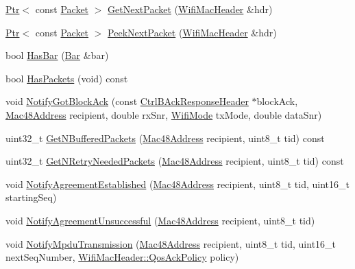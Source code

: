 \begin{DoxyCompactItemize}
\item 
\hyperlink{classns3_1_1Ptr}{Ptr}$<$ const \hyperlink{classns3_1_1Packet}{Packet} $>$ \hyperlink{classns3_1_1BlockAckManager_a11266152bf97c5ed1a06410d6fda4cc9}{Get\+Next\+Packet} (\hyperlink{classns3_1_1WifiMacHeader}{Wifi\+Mac\+Header} \&hdr)
\item 
\hyperlink{classns3_1_1Ptr}{Ptr}$<$ const \hyperlink{classns3_1_1Packet}{Packet} $>$ \hyperlink{classns3_1_1BlockAckManager_a27160e30a1652c3a2cf4c0fca44f4166}{Peek\+Next\+Packet} (\hyperlink{classns3_1_1WifiMacHeader}{Wifi\+Mac\+Header} \&hdr)
\item 
bool \hyperlink{classns3_1_1BlockAckManager_a361d518c0824a4b353336475cda25978}{Has\+Bar} (\hyperlink{structns3_1_1Bar}{Bar} \&bar)
\item 
bool \hyperlink{classns3_1_1BlockAckManager_aa4d33e4f453efea9967dc2ebb7142210}{Has\+Packets} (void) const 
\item 
void \hyperlink{classns3_1_1BlockAckManager_a9b24f21a11eb094fa683943b7fc3c747}{Notify\+Got\+Block\+Ack} (const \hyperlink{classns3_1_1CtrlBAckResponseHeader}{Ctrl\+B\+Ack\+Response\+Header} $\ast$block\+Ack, \hyperlink{classns3_1_1Mac48Address}{Mac48\+Address} recipient, double rx\+Snr, \hyperlink{classns3_1_1WifiMode}{Wifi\+Mode} tx\+Mode, double data\+Snr)
\item 
uint32\+\_\+t \hyperlink{classns3_1_1BlockAckManager_af1da67d0de14b53997fbeedaa93f7380}{Get\+N\+Buffered\+Packets} (\hyperlink{classns3_1_1Mac48Address}{Mac48\+Address} recipient, uint8\+\_\+t tid) const 
\item 
uint32\+\_\+t \hyperlink{classns3_1_1BlockAckManager_a324cd181a4aedaff46eed34f92055591}{Get\+N\+Retry\+Needed\+Packets} (\hyperlink{classns3_1_1Mac48Address}{Mac48\+Address} recipient, uint8\+\_\+t tid) const 
\item 
void \hyperlink{classns3_1_1BlockAckManager_a46a5ec91aff9a426456706443a04f4c9}{Notify\+Agreement\+Established} (\hyperlink{classns3_1_1Mac48Address}{Mac48\+Address} recipient, uint8\+\_\+t tid, uint16\+\_\+t starting\+Seq)
\item 
void \hyperlink{classns3_1_1BlockAckManager_a1bc61922d4b8fbca906162e1f5a908af}{Notify\+Agreement\+Unsuccessful} (\hyperlink{classns3_1_1Mac48Address}{Mac48\+Address} recipient, uint8\+\_\+t tid)
\item 
void \hyperlink{classns3_1_1BlockAckManager_a24ba0bcf0be39d8927e8c04c7dac0f1a}{Notify\+Mpdu\+Transmission} (\hyperlink{classns3_1_1Mac48Address}{Mac48\+Address} recipient, uint8\+\_\+t tid, uint16\+\_\+t next\+Seq\+Number, \hyperlink{classns3_1_1WifiMacHeader_ae3a382482f357972019f5e1b3162adc4}{Wifi\+Mac\+Header\+::\+Qos\+Ack\+Policy} policy)

\end{DoxyCompactItemize}
